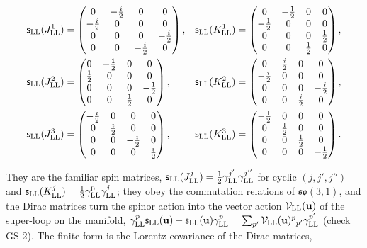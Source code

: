 \documentclass[
  10pt,
]{article}
\begin{document}
\[\begin{aligned}\mathsf s_{\rm LL}(J^1_{\rm LL})&=\begin{pmatrix}0&-\tfrac{i}{2}&0&0\\-\tfrac{i}{2}&0&0&0\\0&0&0&-\tfrac{i}{2}\\0&0&-\tfrac{i}{2}&0\end{pmatrix},&\mathsf s_{\rm LL}(K^1_{\rm LL})&=\begin{pmatrix}0&-\tfrac{1}{2}&0&0\\-\tfrac{1}{2}&0&0&0\\0&0&0&\tfrac{1}{2}\\0&0&\tfrac{1}{2}&0\end{pmatrix},\\ \mathsf s_{\rm LL}(J^2_{\rm LL})&=\begin{pmatrix}0&-\tfrac{1}{2}&0&0\\\tfrac{1}{2}&0&0&0\\0&0&0&-\tfrac{1}{2}\\0&0&\tfrac{1}{2}&0\end{pmatrix},&\mathsf s_{\rm LL}(K^2_{\rm LL})&=\begin{pmatrix}0&\tfrac{i}{2}&0&0\\-\tfrac{i}{2}&0&0&0\\0&0&0&-\tfrac{i}{2}\\0&0&\tfrac{i}{2}&0\end{pmatrix},\\ \mathsf s_{\rm LL}(J^3_{\rm LL})&=\begin{pmatrix}-\tfrac{i}{2}&0&0&0\\0&\tfrac{i}{2}&0&0\\0&0&-\tfrac{i}{2}&0\\0&0&0&\tfrac{i}{2}\end{pmatrix},&\mathsf s_{\rm LL}(K^3_{\rm LL})&=\begin{pmatrix}-\tfrac{1}{2}&0&0&0\\0&\tfrac{1}{2}&0&0\\0&0&\tfrac{1}{2}&0\\0&0&0&-\tfrac{1}{2}\end{pmatrix}.\end{aligned}\]

They are the familiar spin matrices,
\(\mathsf s_{\rm LL}(J^j_{\rm LL})=\tfrac12\gamma^{j'}_{\rm LL}\gamma^{j''}_{\rm LL}\)
for cyclic \((j,j',j'')\) and
\(\mathsf s_{\rm LL}(K^j_{\rm LL})=\tfrac12\gamma^0_{\rm LL}\gamma^j_{\rm LL}\);
they obey the commutation relations of \(\mathfrak{so}(3,1)\), and the
Dirac matrices turn the spinor action into the vector action
\(\mathcal V_{\rm LL}(\mathbf u)\) of the super-loop on the manifold,
\(\gamma^p_{\rm LL}\mathsf s_{\rm LL}(\mathbf u)-\mathsf s_{\rm LL}(\mathbf u)\gamma^p_{\rm LL}=\sum_{p'}\mathcal V_{\rm LL}(\mathbf u)^p{}_{p'}\gamma^{p'}_{\rm LL}\)
(check GS-2). The finite form is the Lorentz covariance of the Dirac
matrices,
\end{document}
